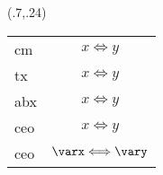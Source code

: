 \documentclass[a4j]{jarticle}
\begin{document}
\begin{showEx}(.7,.24){}
\begin{tabular}{lc}
cm & $x \Longleftrightarrow y$\\
tx & 
  \let\Rightarrow\txRightarrow
  \let\Leftarrow\txLeftarrow
  $x \Longleftrightarrow y$ \\
abx & 
  \let\Rightarrow\abxRightarrow
  \let\Leftarrow\abxLeftarrow
  $x \Longleftrightarrow y$ \\
ceo & 
  \let\Rightarrow\ceoRightarrow
  \let\Leftarrow\ceoLeftarrow
  $x \Longleftrightarrow y$ \\
ceo & 
  \let\Rightarrow\ceoRightarrow
  \let\Leftarrow\ceoLeftarrow
  $\varx \Longleftrightarrow \vary$ \\
\end{tabular}
\end{showEx}
\end{document}
